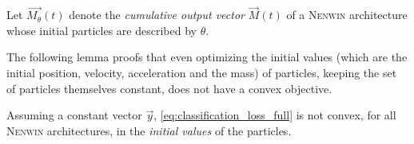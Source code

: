 \begin{definition}
    Let $\vec{M_{\theta}}(t)$ denote the \emph{cumulative output vector} $\vec{M}(t)$ of a \textsc{Nenwin} architecture whose initial particles are described by $\theta$.
\end{definition}

The following lemma proofs that even optimizing the initial values (which are the initial position, velocity, acceleration and the mass) of particles, keeping the set of particles themselves constant, does not have a convex objective.
\begin{lemma}
Assuming a constant vector $\vec{y}$, \eqref{eq:classification_loss_full} is not convex, for all \textsc{Nenwin} architectures, in the \emph{initial values} of the particles.
\label{lemma:nonconvexity_loss}
\end{lemma}
